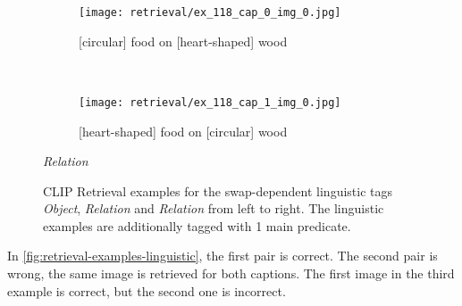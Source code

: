 \begin{figure}[ht]
\begin{minipage}[t]{.30\textwidth}
\begin{subfigure}[t]{\textwidth}
        \centering
        \texttt{[image: retrieval/ex\_118\_cap\_0\_img\_0.jpg]}
        \caption{[circular] food on [heart-shaped] wood}
        \end{subfigure}\\
        \begin{subfigure}[t]{\textwidth}
        \centering
        \texttt{[image: retrieval/ex\_118\_cap\_1\_img\_0.jpg]}
        \caption{[heart-shaped] food on [circular] wood}
        \end{subfigure}%
        \caption*{\textit{Relation}}
    \end{minipage}%
    \caption{CLIP Retrieval examples for the swap-dependent linguistic tags \textit{Object}, \textit{Relation} and \textit{Relation} from left to right. The linguistic examples are additionally tagged with 1 main predicate.}
    \label{fig:retrieval-examples}
\end{figure}

In \cref{fig:retrieval-examples-linguistic}, the first pair is correct. The second pair is wrong, the same image is retrieved for both captions. The first image in the third example is correct, but the second one is incorrect.

